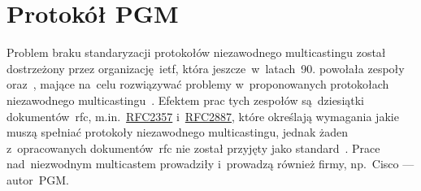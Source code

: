 \documentclass[thesis]{subfiles}
\begin{document}


\section{Protokół PGM}
\label{sec:pgm}

Problem braku standaryzacji protokołów niezawodnego multicastingu został dostrzeżony przez organizację~\gls{ietf}, która jeszcze~w~latach~90. powołała zespoły  oraz~, mające na~celu rozwiązywać problemy w~proponowanych protokołach niezawodnego multicastingu~\cite{reliable-multicast-journal,reliable-multicast-transport}. Efektem prac tych zespołów są~dziesiątki dokumentów~\gls{rfc}, m.in.~\href{https://tools.ietf.org/html/rfc2357.html}{RFC2357} i~\href{https://tools.ietf.org/html/rfc2887}{RFC2887}, które określają wymagania jakie muszą spełniać protokoły niezawodnego multicastingu, jednak żaden z~opracowanych dokumentów~\gls{rfc} nie został przyjęty jako standard~\cite{rfc2887,rfc2357}. Prace nad~niezwodnym multicastem prowadziły i~prowadzą również firmy, np.~Cisco --- autor~PGM.
\end{document}
